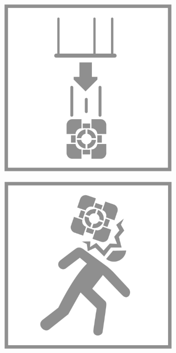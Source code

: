 \begin{figure}[H]
  \begin{subfigure}[l]{0.195\linewidth}
    \includegraphics[width=\textwidth]{Sources/PortalIcons/d1.jpg}
  \end{subfigure}
  \begin{subfigure}[l]{0.195\linewidth}
    \includegraphics[width=\textwidth]{Sources/PortalIcons/d2.jpg}

\end{subfigure}
\end{figure}
